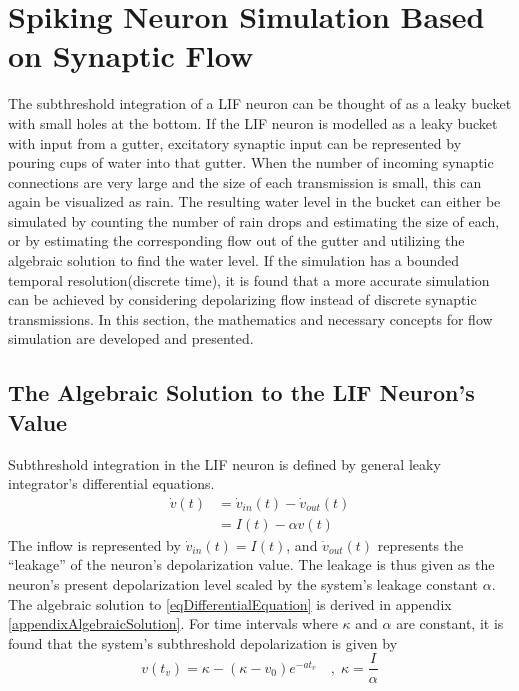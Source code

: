 
\section{Spiking Neuron Simulation Based on Synaptic Flow}
	The subthreshold integration of a LIF neuron can be thought of as a leaky bucket with small holes at the bottom.
	If the LIF neuron is modelled as a leaky bucket with input from a gutter, excitatory synaptic input can be represented by pouring cups of water into that gutter. %
	When the number of incoming synaptic connections are very large and the size of each transmission is small, this can again be visualized as rain.
	The resulting water level in the bucket can either be simulated by counting the number of rain drops and estimating the size of each, or by estimating the corresponding flow out of the gutter and utilizing the 
		algebraic solution to find the water level. %
	If the simulation has a bounded temporal resolution(discrete time), it is found that a more accurate simulation can be achieved by considering depolarizing flow instead of discrete synaptic transmissions.
	In this section, the mathematics and necessary concepts for flow simulation are developed and presented.

	\subsection{The Algebraic Solution to the LIF Neuron's Value}
	\label{ssecTheAlgebraicSolution}
		Subthreshold integration in the LIF neuron is defined by general leaky integrator's differential equations\cite{gerstnerKistler2002KAP04}.
		\begin{equation}
			\begin{split}
				\dot{v}(t)&= \dot{v}_{in}(t) - \dot{v}_{out}(t) \\
					&= I(t) - \alpha v(t)
			\end{split}
			\label{eqDifferentialEquation}
		\end{equation}
		The inflow is represented by $\dot{v}_{in}(t) = I(t)$, and $\dot{v}_{out}(t)$ represents the ``leakage'' of the neuron's depolarization value.
		The leakage is thus given as the neuron's present depolarization level scaled by the system's leakage constant $\alpha$.
		The algebraic solution to \ref{eqDifferentialEquation} is derived in appendix \ref{appendixAlgebraicSolution}.
		For time intervals where $\kappa$ and $\alpha$ are constant, it is found that the system's subthreshold depolarization is given by %
		\begin{equation}
			v(t_v) = \kappa - \left( \kappa - v_0 \right) e^{-at_v} 	\quad,\; \kappa = \frac{I}{\alpha} %
			\label{eqValueEquation}
		\end{equation}

